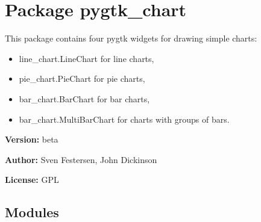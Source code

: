 %
%
%


\section{Package pygtk\_chart}

    \label{pygtk_chart}
This package contains four pygtk widgets for drawing simple charts:

\begin{itemize}
\setlength{\parskip}{0.6ex}
  \item line\_chart.LineChart for line charts,

  \item pie\_chart.PieChart for pie charts,

  \item bar\_chart.BarChart for bar charts,

  \item bar\_chart.MultiBarChart for charts with groups of bars.

\end{itemize}

\textbf{Version:} beta



\textbf{Author:} Sven Festersen, John Dickinson



\textbf{License:} GPL





\subsection{Modules}

